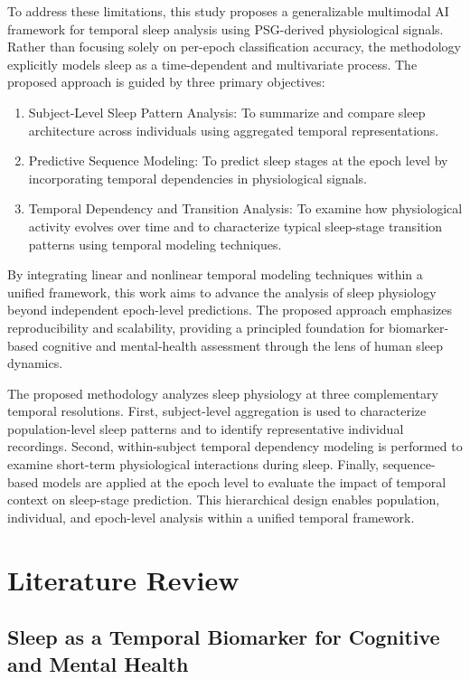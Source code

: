 \documentclass[10pt]{cai26}
\begin{document}
To address these limitations, this study proposes a generalizable multimodal AI framework for temporal sleep analysis using PSG-derived physiological signals. Rather than focusing solely on per-epoch classification accuracy, the methodology explicitly models sleep as a time-dependent and multivariate process. The proposed approach is guided by three primary objectives:
\begin{enumerate}
\item Subject-Level Sleep Pattern Analysis: To summarize and compare sleep architecture across individuals using aggregated temporal representations.
\item Predictive Sequence Modeling: To predict sleep stages at the epoch level by incorporating temporal dependencies in physiological signals.
\item Temporal Dependency and Transition Analysis: To examine how physiological activity evolves over time and to characterize typical sleep-stage transition patterns using temporal modeling techniques.
\end{enumerate}

By integrating linear and nonlinear temporal modeling techniques within a unified framework, this work aims to advance the analysis of sleep physiology beyond independent epoch-level predictions. The proposed approach emphasizes reproducibility and scalability, providing a principled foundation for biomarker-based cognitive and mental-health assessment through the lens of human sleep dynamics.

The proposed methodology analyzes sleep physiology at three complementary temporal resolutions. First, subject-level aggregation is used to characterize population-level sleep patterns and to identify representative individual recordings. Second, within-subject temporal dependency modeling is performed to examine short-term physiological interactions during sleep. Finally, sequence-based models are applied at the epoch level to evaluate the impact of temporal context on sleep-stage prediction. This hierarchical design enables population, individual, and epoch-level analysis within a unified temporal framework.

\section{Literature Review}

\subsection{Sleep as a Temporal Biomarker for Cognitive and Mental Health}
\end{document}
